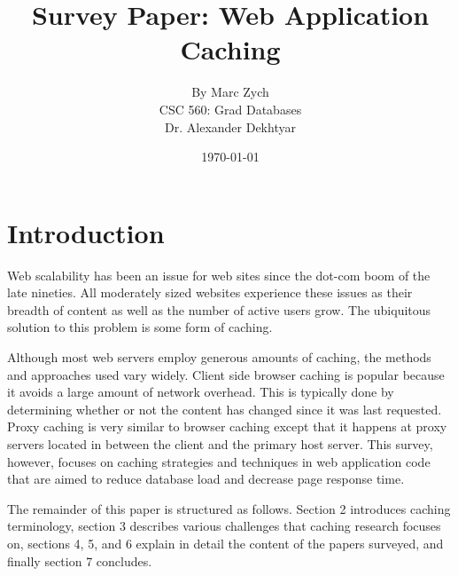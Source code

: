 \documentclass[12pt]{article}
\begin{document}
\title{\vfill Survey Paper: Web Application Caching}

\author{
By Marc Zych \vspace{10pt} \\
CSC 560: Grad Databases \vspace{10pt} \\
Dr. Alexander Dekhtyar \vspace{10pt} \\
}
\date{\today}

\maketitle


\vfill

\thispagestyle{empty}
\newpage



\section{Introduction}
Web scalability has been an issue for web sites since the dot-com boom of the late nineties.
All moderately sized websites experience these issues as their breadth of content as well as the number of active users grow.
The ubiquitous solution to this problem is some form of caching.

Although most web servers employ generous amounts of caching, the methods and approaches used vary widely.
Client side browser caching is popular because it avoids a large amount of network overhead.
This is typically done by determining whether or not the content has changed since it was last requested.
Proxy caching is very similar to browser caching except that it happens at proxy servers located in between the client and the primary host server.
This survey, however, focuses on caching strategies and techniques in web application code that are aimed to reduce database load and decrease page response time.

The remainder of this paper is structured as follows.
Section 2 introduces caching terminology, section 3 describes various challenges that caching research focuses on, sections 4, 5, and 6 explain in detail the content of the papers surveyed, and finally section 7 concludes.
\end{document}
